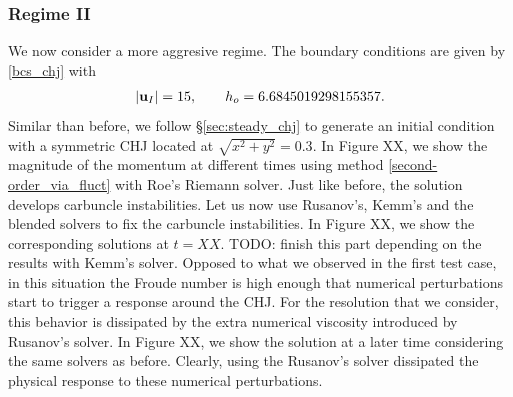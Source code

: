 \documentclass[preprint, 11pt]{article}
\newcommand{\bfu}{{\bf u}}
\begin{document}
\subsubsection{Regime II}
We now consider a more aggresive regime. The boundary conditions are given by \eqref{bcs_chj} with 
\begin{align}\label{bcs_chj_r2}
  |\bfu_I|=15, \qquad h_o=6.6845019298155357.
\end{align}
Similar than before, we follow \S \ref{sec:steady_chj} to generate an initial condition with a symmetric CHJ located at
$\sqrt{x^2+y^2}=0.3$. In Figure XX, we show the magnitude of the momentum at different times using method
\eqref{second-order_via_fluct} with Roe's Riemann solver. Just like before, the solution develops
carbuncle instabilities. Let us now use Rusanov's, Kemm's and the blended solvers to fix the
carbuncle instabilities. In Figure XX, we show the corresponding solutions at $t=XX$.
{\color{red} TODO: finish this part depending on the results with Kemm's solver.}
%
Opposed to what we observed in the first test case, in this situation the Froude number is
high enough that numerical perturbations start to trigger a response around the CHJ.
For the resolution that we consider, this behavior is dissipated by the extra numerical viscosity introduced by
Rusanov's solver. In Figure XX, we show the solution at a later time considering the same solvers as before.
Clearly, using the Rusanov's solver dissipated the physical response to these numerical perturbations. 
\end{document}
